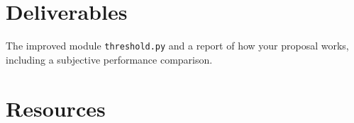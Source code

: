 \begin{comment}
\subsection{Subjective performance}

\begin{enumerate}
\item Using a recording tool such as
  \href{http://audacity.sourceforge.net}{Audacity} or
  \href{http://plugin.org.uk/timemachine/}{JACK Timemachine}, record
  the simulated transmission of a piece of audio and create a
  \texttt{.wav} file, when the audio has been transmitted using
  \texttt{temporal\_overlapped\_DWT\_coding.py} and
  \texttt{threshold.py}, using in both cases the same transmission
  bit-rate. Vary the quantization step size for controlling the
  bit-rate.
\item Determine which audio sounds better, from a subjective point of
  view. Repeat this step the number of times you consider necessary.
\end{enumerate}
\end{comment}

\section{Deliverables}

The improved module \verb|threshold.py| and a report of how your proposal works,
including a subjective performance comparison.

\section{Resources}



